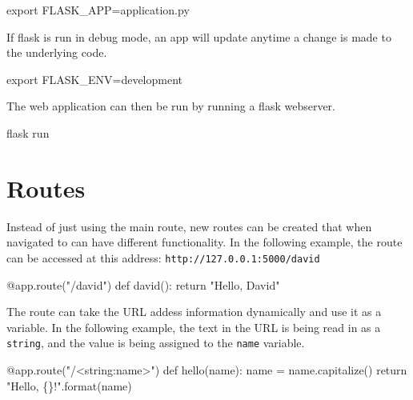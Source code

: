 \documentclass[]{book}
\newenvironment{Shaded}{\begin{snugshade}}{\end{snugshade}}
\newcommand{\StringTok}[1]{\textcolor[rgb]{0.31,0.60,0.02}{#1}}
\newcommand{\VariableTok}[1]{\textcolor[rgb]{0.00,0.00,0.00}{#1}}
\newcommand{\BuiltInTok}[1]{#1}
\newcommand{\ExtensionTok}[1]{#1}
\newcommand{\NormalTok}[1]{#1}
\begin{document}
\begin{Shaded}
\begin{Highlighting}[]
\BuiltInTok{export} \VariableTok{FLASK_APP=}\NormalTok{application.py}
\end{Highlighting}
\end{Shaded}

If flask is run in debug mode, an app will update anytime a change is
made to the underlying code.

\begin{Shaded}
\begin{Highlighting}[]
\BuiltInTok{export} \VariableTok{FLASK_ENV=}\NormalTok{development}
\end{Highlighting}
\end{Shaded}

The web application can then be run by running a flask webserver.

\begin{Shaded}
\begin{Highlighting}[]
\ExtensionTok{flask}\NormalTok{ run}
\end{Highlighting}
\end{Shaded}

\section{Routes}\label{routes}

Instead of just using the main route, new routes can be created that
when navigated to can have different functionality. In the following
example, the route can be accessed at this address:
\texttt{http://127.0.0.1:5000/david}

\begin{Shaded}
\begin{Highlighting}[]
\ExtensionTok{@app.route}\NormalTok{(}\StringTok{"/david"}\NormalTok{)}
\ExtensionTok{def}\NormalTok{ david()}\BuiltInTok{:}
    \BuiltInTok{return} \StringTok{"Hello, David"}
\end{Highlighting}
\end{Shaded}

The route can take the URL addess information dynamically and use it as
a variable. In the following example, the text in the URL is being read
in as a \texttt{string}, and the value is being assigned to the
\texttt{name} variable.

\begin{Shaded}
\begin{Highlighting}[]
\ExtensionTok{@app.route}\NormalTok{(}\StringTok{"/<string:name>"}\NormalTok{)}
\ExtensionTok{def}\NormalTok{ hello(name)}\BuiltInTok{:}
    \ExtensionTok{name}\NormalTok{ = name.capitalize()}
    \BuiltInTok{return} \StringTok{"Hello, \{\}!"}\NormalTok{.format(name)}
\end{Highlighting}
\end{Shaded}
\end{document}
